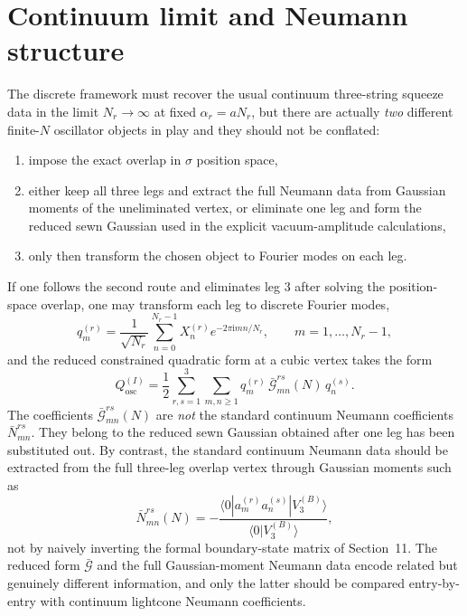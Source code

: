 \documentclass[11pt]{article}
\numberwithin{equation}{section}
\newcommand{\ii}{\mathrm{i}}
\begin{document}
\section{Continuum limit and Neumann structure}
The discrete framework must recover the usual continuum three-string squeeze data in the limit $N_r\to\infty$ at fixed $\alpha_r=aN_r$, but there are actually \emph{two} different finite-$N$ oscillator objects in play and they should not be conflated:
\begin{enumerate}
\item impose the exact overlap in $\sigma$ position space,
\item either keep all three legs and extract the full Neumann data from Gaussian moments of the uneliminated vertex, or eliminate one leg and form the reduced sewn Gaussian used in the explicit vacuum-amplitude calculations,
\item only then transform the chosen object to Fourier modes on each leg.
\end{enumerate}
If one follows the second route and eliminates leg $3$ after solving the position-space overlap, one may transform each leg to discrete Fourier modes,
\begin{equation}
\label{eq:s16-001}
q_m^{(r)}=\frac{1}{\sqrt{N_r}}\sum_{n=0}^{N_r-1} X_n^{(r)} e^{-2\pi \ii mn/N_r},
\qquad
m=1,\dots,N_r-1,
\end{equation}
and the reduced constrained quadratic form at a cubic vertex takes the form
\begin{equation}
\label{eq:s16-002}
Q^{(I)}_{\mathrm{osc}}
=
\frac12
\sum_{r,s=1}^3
\sum_{m,n\geq 1}
q_m^{(r)}\,\bar{\mathcal G}^{rs}_{mn}(N)\,q_n^{(s)}.
\end{equation}
The coefficients $\bar{\mathcal G}^{rs}_{mn}(N)$ are \emph{not} the standard continuum Neumann coefficients $\bar N^{rs}_{mn}$. They belong to the reduced sewn Gaussian obtained after one leg has been substituted out. By contrast, the standard continuum Neumann data should be extracted from the full three-leg overlap vertex through Gaussian moments such as
\begin{equation}
\label{eq:s16-003}
\bar N^{rs}_{mn}(N)
=
-\frac{\langle 0|a_m^{(r)}a_n^{(s)}|V_3^{(B)}\rangle}
{\langle 0|V_3^{(B)}\rangle},
\end{equation}
not by naively inverting the formal boundary-state matrix of Section~11. The reduced form $\bar{\mathcal G}$ and the full Gaussian-moment Neumann data encode related but genuinely different information, and only the latter should be compared entry-by-entry with continuum lightcone Neumann coefficients.
\end{document}

